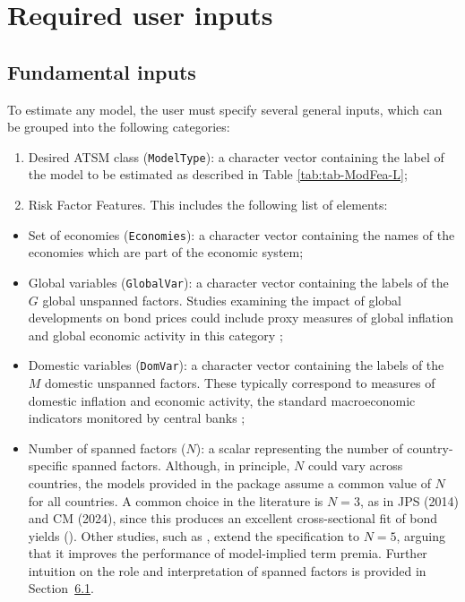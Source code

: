 \section{Required user inputs}\label{S:SectionInputs}

\subsection{Fundamental inputs}\label{fundamental-inputs}

To estimate any model, the user must specify several general inputs, which can be grouped into the following categories:

\begin{enumerate}
\def\labelenumi{\arabic{enumi}.}
\item
  Desired ATSM class (\texttt{ModelType}): a character vector containing the label of the model to be estimated as described in Table \ref{tab:tab-ModFea-L};
\item
  Risk Factor Features. This includes the following list of elements:
\end{enumerate}

\begin{itemize}
\item
  Set of economies (\texttt{Economies}): a character vector containing the names of the economies which are part of the economic system;
\item
  Global variables (\texttt{GlobalVar}): a character vector containing the labels of the \(G\) global unspanned factors. Studies examining the impact of global developments on bond prices could include proxy measures of global inflation and global economic activity in this category \citep{JotikasthiraLeLundblad2015, AbbrittiDellErbaMorenoSola2018, CandelonMoura2024};
\item
  Domestic variables (\texttt{DomVar}): a character vector containing the labels of the \(M\) domestic unspanned factors. These typically correspond to measures of domestic inflation and economic activity, the standard macroeconomic indicators monitored by central banks \citep{AngPiazzesi2003, JoslinPriebschSingleton2014, JotikasthiraLeLundblad2015, CandelonMoura2024};
\item
  Number of spanned factors (\(N\)): a scalar representing the number of country-specific spanned factors. Although, in principle, \(N\) could vary across countries, the models provided in the package assume a common value of \(N\) for all countries.
  A common choice in the literature is \(N=3\), as in JPS (2014) and CM (2024), since this produces an excellent cross-sectional fit of bond yields (\citet{LittermanScheinkman1991}).
  Other studies, such as \citet{AdrianCrumpMoench2013}, extend the specification to \(N=5\), arguing that it improves the performance of model-implied term premia. Further intuition on the role and interpretation of spanned factors is provided in Section~\hyperref[S:SpaFac]{6.1}.
\end{itemize}

